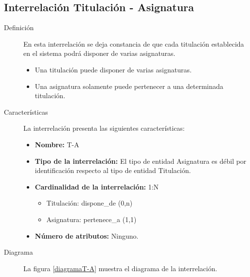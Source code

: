 \subsection{Interrelación Titulación - Asignatura}

   \begin{description}
      \item[Definición] En esta interrelación se deja constancia de que cada
      titulación establecida en el sistema podrá disponer de varias asignaturas.

      \begin{itemize}
       \item Una titulación puede disponer de varias asignaturas.
       \item Una asignatura solamente puede pertenecer a una determinada
             titulación.
      \end{itemize}

      \item[Características] La interrelación presenta las siguientes
                             características:

         \begin{itemize}
            \item \textbf{Nombre:} T-A
            \item \textbf{Tipo de la interrelación:} El tipo de entidad
                  Asignatura es débil por identificación respecto al tipo de
                  entidad Titulación.
            \item \textbf{Cardinalidad de la interrelación:} 1:N
                  \begin{itemize}
                     \item Titulación: dispone\_de (0,n)
                     \item Asignatura: pertenece\_a (1,1)
                  \end{itemize}
            \item \textbf{Número de atributos:} Ninguno.
         \end{itemize}

      \item[Diagrama] La figura \ref{diagramaT-A} muestra el diagrama de la
                      interrelación.


\end{description}
